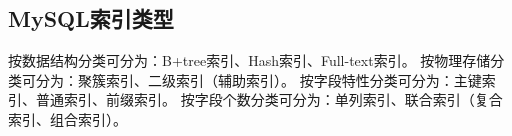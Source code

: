 \documentclass[../../../interview-questions.tex]{subfiles}
\begin{document}
\subsection{MySQL索引类型}

按数据结构分类可分为：B+tree索引、Hash索引、Full-text索引。
按物理存储分类可分为：聚簇索引、二级索引（辅助索引）。
按字段特性分类可分为：主键索引、普通索引、前缀索引。
按字段个数分类可分为：单列索引、联合索引（复合索引、组合索引）。
\end{document}
